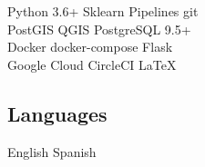 \documentclass[letterpaper]{deedy-resume} %
\begin{document}
\begin{minipage}[t]{0.33\textwidth}
Python 3.6+ \textbullet{} Sklearn Pipelines \textbullet{} git \\
PostGIS \textbullet{} QGIS \textbullet{} PostgreSQL 9.5+ \\
Docker \textbullet{} docker-compose \textbullet{} Flask\\
Google Cloud \textbullet{} CircleCI \textbullet{} \LaTeX\\

\sectionspace %

\subsection{Languages}

English \textbullet{} Spanish

\sectionspace %


\end{minipage} %
\hfill
%
%
\end{document}
